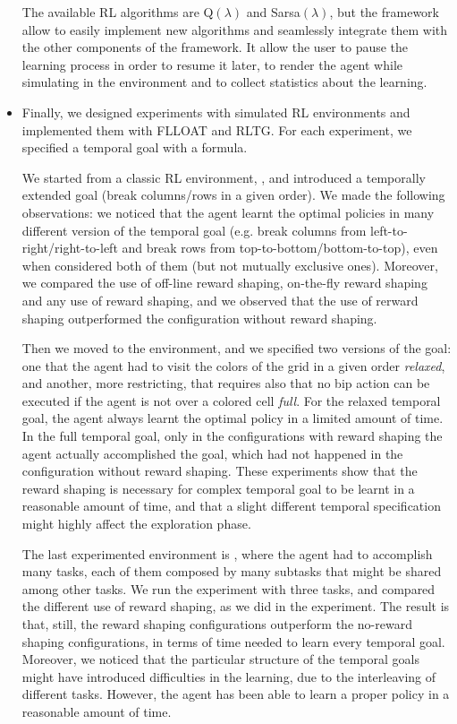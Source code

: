 \begin{itemize}
	The available RL algorithms are Q$(\lambda)$ and Sarsa$(\lambda)$, but the framework allow to easily implement new algorithms and seamlessly integrate them with the other components of the framework. It allow the user to pause the learning process in order to resume it later, to render the agent while simulating in the environment and to collect statistics about the learning.
	
	\item Finally, we designed experiments with simulated RL environments and implemented them with FLLOAT and RLTG. For each experiment, we specified a temporal goal with a \LLf formula.
	
	We started from a classic RL environment, \Breakout, and introduced a temporally extended goal (break columns/rows in a given order). We made the following observations: we noticed that the agent learnt the optimal policies in many different version of the temporal goal (e.g. break columns from left-to-right/right-to-left and break rows from top-to-bottom/bottom-to-top), even when considered both of them (but not mutually exclusive ones). Moreover, we compared the use of off-line reward shaping, on-the-fly reward shaping and any use of reward shaping, and we observed that the use of rerward shaping outperformed the configuration without reward shaping.
	
	Then we moved to the \Sapientino environment, and we specified two versions of the goal: one that the agent had to visit the colors of the grid in a given order \emph{relaxed}, and another, more restricting, that requires also that no bip action can be executed if the agent is not over a colored cell \emph{full}. For the relaxed temporal goal, the agent always learnt the optimal policy in a limited amount of time. In the full temporal goal, only in the configurations with reward shaping the agent actually accomplished the goal, which had not happened in the configuration without reward shaping. These experiments show that the reward shaping is necessary for complex temporal goal to be learnt in a reasonable amount of time, and that a slight different temporal specification might highly affect the exploration phase.
	
	The last experimented environment is \Minecraft, where the agent had to accomplish many tasks, each of them composed by many subtasks that might be shared among other tasks. We run the experiment with three tasks, and compared the different use of reward shaping, as we did in the \Breakout experiment. The result is that, still, the reward shaping configurations outperform the no-reward shaping configurations, in terms of time needed to learn every temporal goal. 
	Moreover, we noticed that the particular structure of the temporal goals might have introduced difficulties in the learning, due to the interleaving of different tasks. However, the agent has been able to learn a proper policy in a reasonable amount of time.
	
	

\end{itemize}


